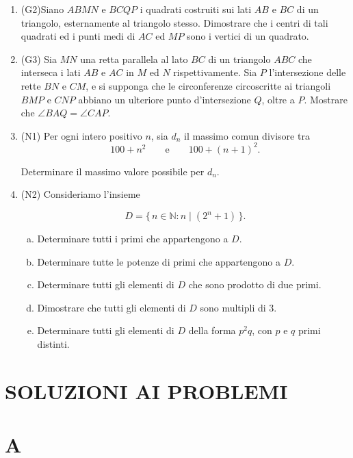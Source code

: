 \documentclass[11pt]{scrartcl}
\begin{document}
\begin{enumerate}[\bfseries 1.]
\item %
  (G2)Siano $A B M N$ e $B C Q P$ i quadrati costruiti sui lati
$A B$ e $B C$ di un triangolo, esternamente al triangolo stesso.
Dimostrare che i centri di tali quadrati ed i punti medi di $A C$ ed
$M P$ sono i vertici di un quadrato.

\item %
  (G3) Sia $M N$ una retta parallela al lato $B C$ di un triangolo $A B C$ che
interseca i lati $A B$ e $A C$ in $M$ ed $N$ rispettivamente.
Sia $P$ l'intersezione delle rette $B N$ e $C M$, e si supponga
che le circonferenze circoscritte ai triangoli $B M P$ e $C N P$
abbiano un ulteriore punto d'intersezione $Q$, oltre a $P$.
Mostrare che $\angle BAQ=\angle CAP$.
\item %
  (N1) Per ogni intero positivo $n$, sia $d_n$ il massimo comun divisore tra
\[
100 + n^2 \qquad \text{e} \qquad 100 + (n+1)^2 .
\]

Determinare il massimo valore possibile per $d_n$.

\item %
  (N2) Consideriamo l’insieme

\[
D = \{\, n \in \mathbb{N} : n \mid (2^n + 1) \,\}.
\]
\begin{enumerate}[(a)]
    \item Determinare tutti i primi che appartengono a \(D\).
    \item Determinare tutte le potenze di primi che appartengono a \(D\).
    \item Determinare tutti gli elementi di \(D\) che sono prodotto di due primi.
    \item Dimostrare che tutti gli elementi di \(D\) sono multipli di \(3\).
    \item Determinare tutti gli elementi di \(D\) della forma \(p^2 q\), con \(p\) e \(q\) primi distinti.
\end{enumerate}

\end{enumerate}




\pagebreak




\section{SOLUZIONI AI PROBLEMI}
\section{A}
\end{document}
